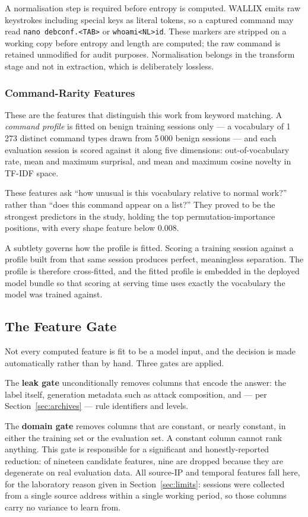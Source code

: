 \documentclass{classeENS}
\begin{document}
A normalisation step is required before entropy is computed. WALLIX emits raw keystrokes including special keys as literal tokens, so a captured command may read \texttt{nano debconf.<TAB>} or \texttt{whoami<NL>id}. These markers are stripped on a working copy before entropy and length are computed; the raw command is retained unmodified for audit purposes. Normalisation belongs in the transform stage and not in extraction, which is deliberately lossless.

\subsubsection{Command-Rarity Features}
\label{sec:rarity}
These are the features that distinguish this work from keyword matching. A \emph{command profile} is fitted on benign training sessions only --- a vocabulary of 1\,273 distinct command types drawn from 5\,000 benign sessions --- and each evaluation session is scored against it along five dimensions: out-of-vocabulary rate, mean and maximum surprisal, and mean and maximum cosine novelty in TF-IDF space.

These features ask ``how unusual is this vocabulary relative to normal work?'' rather than ``does this command appear on a list?'' They proved to be the strongest predictors in the study, holding the top permutation-importance positions, with every shape feature below 0.008.

A subtlety governs how the profile is fitted. Scoring a training session against a profile built from that same session produces perfect, meaningless separation. The profile is therefore cross-fitted, and the fitted profile is embedded in the deployed model bundle so that scoring at serving time uses exactly the vocabulary the model was trained against.

\subsection{The Feature Gate}
\label{sec:gate}
Not every computed feature is fit to be a model input, and the decision is made automatically rather than by hand. Three gates are applied.

The \textbf{leak gate} unconditionally removes columns that encode the answer: the label itself, generation metadata such as attack composition, and --- per Section~\ref{sec:archives} --- rule identifiers and levels.

The \textbf{domain gate} removes columns that are constant, or nearly constant, in either the training set or the evaluation set. A constant column cannot rank anything. This gate is responsible for a significant and honestly-reported reduction: of nineteen candidate features, nine are dropped because they are degenerate on real evaluation data. All source-IP and temporal features fall here, for the laboratory reason given in Section~\ref{sec:limits}: sessions were collected from a single source address within a single working period, so those columns carry no variance to learn from.
\end{document}
